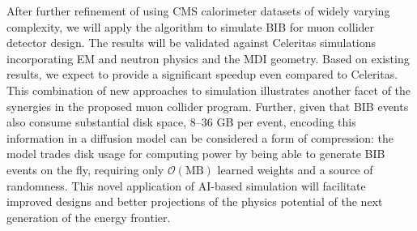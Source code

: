 After further refinement of \diffu using CMS calorimeter datasets of widely varying complexity,
we will apply the algorithm to simulate BIB for muon collider detector design.
The results will be validated against Celeritas simulations incorporating EM and neutron physics and the MDI geometry.
Based on existing results, we expect \diffu to provide a significant speedup even compared to Celeritas.
This combination of new approaches to simulation illustrates another facet of the synergies in the proposed muon collider program.
Further, given that BIB events also consume substantial disk space, 8--36 GB per event,
encoding this information in a diffusion model can be considered a form of compression:
the model trades disk usage for computing power by being able to generate BIB events on the fly,
requiring only $\mathcal{O}(\text{MB})$ learned weights and a source of randomness.
This novel application of AI-based simulation will facilitate improved designs and
better projections of the physics potential of the next generation of the energy frontier.